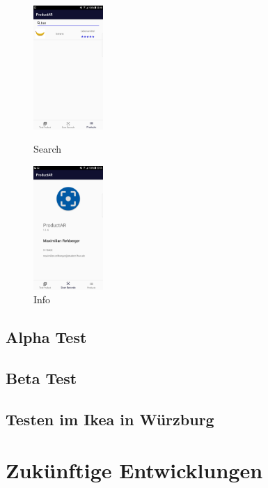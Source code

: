 \documentclass{scrartcl}
\begin{document}
\begin{figure}[h]
   \begin{minipage}[b]{.2\linewidth} %
      \includegraphics[width=100px]{img/screenshots/screenshot_7.png}
      \caption{Search}
   \end{minipage}
   \hspace{.1\linewidth}%
   \begin{minipage}[b]{.2\linewidth} %
      \includegraphics[width=100px]{img/screenshots/screenshot_8.png}
      \caption{Info}
   \end{minipage}
\end{figure}

\subsection{Alpha Test}

\subsection{Beta Test}

\subsection{Testen im Ikea in Würzburg}


\newpage

\section{Zukünftige Entwicklungen}
\end{document}
